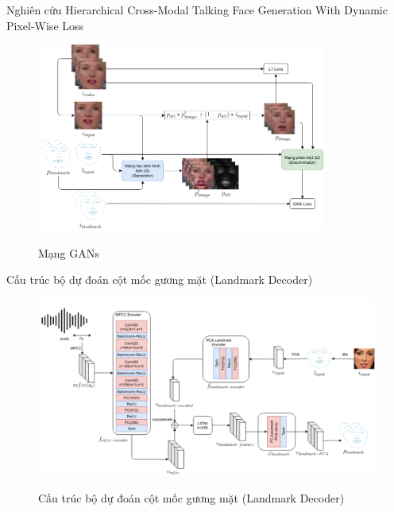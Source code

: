 \begin{frame}{Nghiên cứu Hierarchical Cross-Modal Talking Face Generation With Dynamic Pixel-Wise Loss \cite{chen2019}}
    \begin{figure}[H]
    \centering
    \includegraphics[width=9.5cm]{images/processing-gan.png}
    \label{fig:processing-gan}
    \caption{Mạng GANs}
    \end{figure}
\end{frame}

\begin{frame}{Cấu trúc bộ dự đoán cột mốc gương mặt (Landmark Decoder)}
    \begin{figure}[H]
        \centering
        \includegraphics[width=13cm]{images/landmark_decoder.png}
        \label{fig:landmark_decoder}
        \caption{Cấu trúc bộ dự đoán cột mốc gương mặt (Landmark Decoder)}
    \end{figure}
\end{frame}

